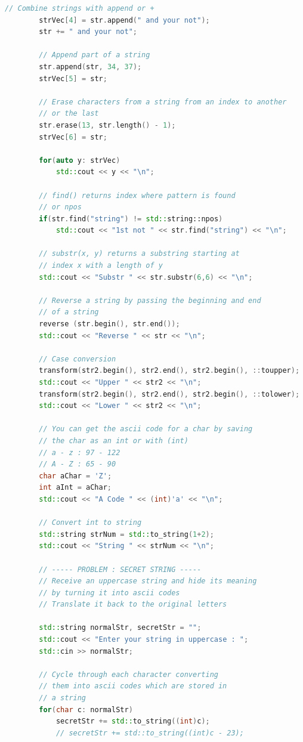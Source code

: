 \documentclass[12pt , a4paper]{article}
\begin{document}
\begin{lstlisting}[language=C++]
	    // Combine strings with append or +
	    strVec[4] = str.append(" and your not");
	    str += " and your not";
	    
	    // Append part of a string
	    str.append(str, 34, 37);
	    strVec[5] = str;
	    
	    // Erase characters from a string from an index to another
	    // or the last
	    str.erase(13, str.length() - 1);
	    strVec[6] = str;
	    
	    for(auto y: strVec)
	        std::cout << y << "\n";
	    
	    // find() returns index where pattern is found
	    // or npos
	    if(str.find("string") != std::string::npos)
	        std::cout << "1st not " << str.find("string") << "\n";
	    
	    // substr(x, y) returns a substring starting at
	    // index x with a length of y
	    std::cout << "Substr " << str.substr(6,6) << "\n";
	    
	    // Reverse a string by passing the beginning and end
	    // of a string
	    reverse (str.begin(), str.end());
	    std::cout << "Reverse " << str << "\n";
	    
	    // Case conversion
	    transform(str2.begin(), str2.end(), str2.begin(), ::toupper);
	    std::cout << "Upper " << str2 << "\n";
	    transform(str2.begin(), str2.end(), str2.begin(), ::tolower);
	    std::cout << "Lower " << str2 << "\n";
	    
	    // You can get the ascii code for a char by saving
	    // the char as an int or with (int)
	    // a - z : 97 - 122
	    // A - Z : 65 - 90
	    char aChar = 'Z';
	    int aInt = aChar;
	    std::cout << "A Code " << (int)'a' << "\n";
	    
	    // Convert int to string
	    std::string strNum = std::to_string(1+2);
	    std::cout << "String " << strNum << "\n";
	    
	    // ----- PROBLEM : SECRET STRING -----
	    // Receive an uppercase string and hide its meaning
	    // by turning it into ascii codes
	    // Translate it back to the original letters
	    
	    std::string normalStr, secretStr = "";
	    std::cout << "Enter your string in uppercase : ";
	    std::cin >> normalStr;
	    
	    // Cycle through each character converting 
	    // them into ascii codes which are stored in
	    // a string
	    for(char c: normalStr)
	        secretStr += std::to_string((int)c);
	        // secretStr += std::to_string((int)c - 23);
	    

\end{lstlisting}
\end{document}
